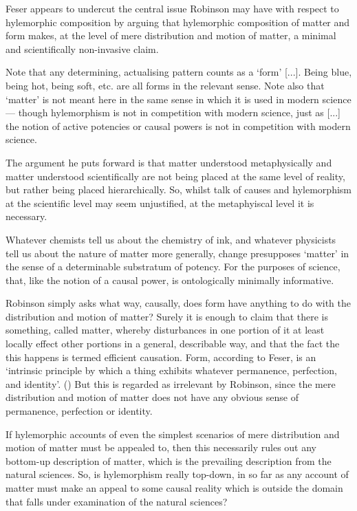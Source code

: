 Feser appears to undercut the central issue Robinson may have with respect to hylemorphic composition by arguing that hylemorphic composition of matter and form makes, at the level of mere distribution and motion of matter, a minimal and scientifically non-invasive claim.
\begin{quoting}
Note that any determining, actualising pattern counts as a `form' [...]. Being blue, being hot, being soft, etc. are all forms in the relevant sense. Note also that `matter' is not meant here in the same sense in which it is used in modern science --- though hylemorphism is not in competition with modern science, just as [...] the notion of active potencies or causal powers is not in competition with modern science. \parencite[][161]{feser2014scholastic}
\end{quoting}
The argument he puts forward is that matter understood metaphysically and matter understood scientifically are not being placed at the same level of reality, but rather being placed hierarchically. So, whilst talk of causes and hylemorphism at the scientific level may seem unjustified, at the metaphyiscal level it is necessary.
\begin{quoting}
Whatever chemists tell us about the chemistry of ink, and whatever physicists tell us about the nature of matter more generally, change presupposes `matter' in the sense of a determinable substratum of potency. For the purposes of science, that, like the notion of a causal power, is ontologically minimally informative. \parencite[][161]{feser2014scholastic}
\end{quoting}

Robinson simply asks what way, causally, does form have anything to do with the distribution and motion of matter? Surely it is enough to claim that there is something, called matter, whereby disturbances in one portion of it at least locally effect other portions in a general, describable way, and that the fact the this happens is termed efficient causation.
Form, according to Feser, is an `intrinsic principle by which a thing exhibits whatever permanence, perfection, and identity'. (\citeyear[][162]{feser2014scholastic}) But this is regarded as irrelevant by Robinson, since the mere distribution and motion of matter does not have any obvious sense of permanence, perfection or identity.

If hylemorphic accounts of even the simplest scenarios of mere distribution and motion of matter must be appealed to, then this necessarily rules out any bottom-up description of matter, which is the prevailing description from the natural sciences. So, is hylemorphism really top-down, in so far as any account of matter must make an appeal to some causal reality which is outside the domain that falls under examination of the natural sciences?



